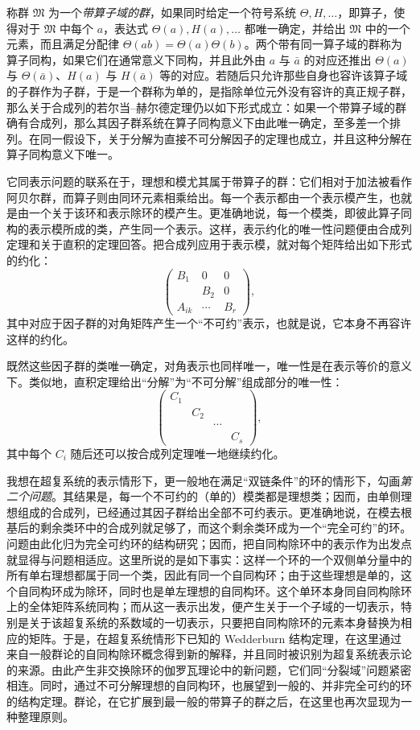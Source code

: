 称群 $\mathfrak{M}$ 为一个\emph{带算子域的群}，如果同时给定一个符号系统 $\Theta,H,\ldots$，即算子，使得对于 $\mathfrak{M}$ 中每个 $a$，表达式 $\Theta(a),H(a),\ldots$ 都唯一确定，并给出 $\mathfrak{M}$ 中的一个元素，而且满足分配律 $\Theta(ab)=\Theta(a)\Theta(b)$。两个带有同一算子域的群称为算子同构，如果它们在通常意义下同构，并且此外由 $a$ 与 $\bar a$ 的对应还推出 $\Theta(a)$ 与 $\Theta(\bar a)$、$H(a)$ 与 $H(\bar a)$ 等的对应。若随后只允许那些自身也容许该算子域的子群作为子群，于是一个群称为单的，是指除单位元外没有容许的真正规子群，那么关于合成列的若尔当--赫尔德定理仍以如下形式成立：如果一个带算子域的群确有合成列，那么其因子群系统在算子同构意义下由此唯一确定，至多差一个排列。在同一假设下，关于分解为直接不可分解因子的定理也成立，并且这种分解在算子同构意义下唯一。

它同表示问题的联系在于，理想和模尤其属于带算子的群：它们相对于加法被看作阿贝尔群，而算子则由同环元素相乘给出。每一个表示都由一个表示模产生，也就是由一个关于该环和表示除环的模产生。更准确地说，每一个模类，即彼此算子同构的表示模所成的类，产生同一个表示。这样，表示约化的唯一性问题便由合成列定理和关于直积的定理回答。把合成列应用于表示模，就对每个矩阵给出如下形式的约化：
\[
\begin{pmatrix}
B_1&0&0\\
&B_2&0\\
A_{ik}&\cdots&B_r
\end{pmatrix},
\]
其中对应于因子群的对角矩阵产生一个“不可约”表示，也就是说，它本身不再容许这样的约化。

既然这些因子群的类唯一确定，对角表示也同样唯一，唯一性是在表示等价的意义下。类似地，直积定理给出“分解”为“不可分解”组成部分的唯一性：
\[
\begin{pmatrix}
C_1&&&\\
&C_2&&\\
&&\cdots&\\
&&&C_s
\end{pmatrix},
\]
其中每个 $C_i$ 随后还可以按合成列定理唯一地继续约化。

我想在超复系统的表示情形下，更一般地在满足“双链条件”的环的情形下，勾画\emph{第二个问题}。其结果是，每一个不可约的（单的）模类都是理想类；因而，由单侧理想组成的合成列，已经通过其因子群给出全部不可约表示。更准确地说，在模去根基后的剩余类环中的合成列就足够了，而这个剩余类环成为一个“完全可约”的环。问题由此化归为完全可约环的结构研究；因而，把自同构除环中的表示作为出发点就显得与问题相适应。这里所说的是如下事实：这样一个环的一个双侧单分量中的所有单右理想都属于同一个类，因此有同一个自同构环；由于这些理想是单的，这个自同构环成为除环，同时也是单左理想的自同构环。这个单环本身同自同构除环上的全体矩阵系统同构；而从这一表示出发，便产生关于一个子域的一切表示，特别是关于该超复系统的系数域的一切表示，只要把自同构除环的元素本身替换为相应的矩阵。于是，在超复系统情形下已知的 Wedderburn 结构定理，在这里通过来自一般群论的自同构除环概念得到新的解释，并且同时被识别为超复系统表示论的来源。由此产生非交换除环的伽罗瓦理论中的新问题，它们同“分裂域”问题紧密相连。同时，通过不可分解理想的自同构环，也展望到一般的、并非完全可约的环的结构定理。群论，在它扩展到最一般的带算子的群之后，在这里也再次显现为一种整理原则。

